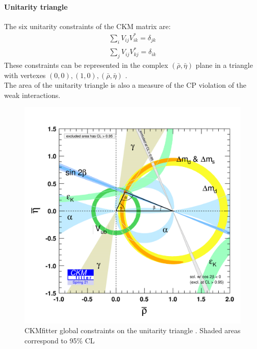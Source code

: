 \paragraph*{Unitarity triangle}
The six unitarity constraints of the CKM matrix are:
\begin{gather}
    \sum_i V_{ij}V_{ik}^*=\delta_{jk}\\
    \sum_j V_{ij}V_{kj}^*=\delta_{ik}
\end{gather}
These constraints can be represented in the complex $(\bar{\rho},\bar{\eta})$ plane in a triangle with vertexes $(0,0), (1,0), (\bar{\rho},\bar{\eta})$ .\\
The area of the unitarity triangle is also a measure of the CP violation of the weak interactions.
\begin{figure}[h]
    \centering
    \includegraphics[width=0.85\linewidth]{fig//chap02-theory/triangle.png}
    \caption{CKMfitter global constraints on the unitarity triangle \cite{CKMfitter}. Shaded areas correspond to 95\% CL}
    \label{fig:triangle}
\end{figure}

